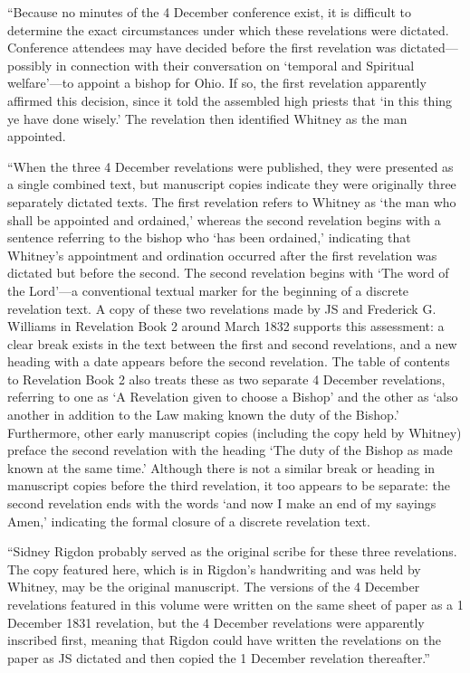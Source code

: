 				``Because no minutes of the 4 December conference exist, it is difficult to determine the exact circumstances under which these revelations were dictated. Conference attendees may have decided before the first revelation was dictated---possibly in connection with their conversation on `temporal and Spiritual welfare'---to appoint a bishop for Ohio. If so, the first revelation apparently affirmed this decision, since it told the assembled high priests that `in this thing ye have done wisely.' The revelation then identified Whitney as the man appointed.

				``When the three 4 December revelations were published, they were presented as a single combined text, but manuscript copies indicate they were originally three separately dictated texts. The first revelation refers to Whitney as `the man who shall be appointed and ordained,' whereas the second revelation begins with a sentence referring to the bishop who `has been ordained,' indicating that Whitney's appointment and ordination occurred after the first revelation was dictated but before the second. The second revelation begins with `The word of the Lord'---a conventional textual marker for the beginning of a discrete revelation text. A copy of these two revelations made by JS and Frederick G. Williams in Revelation Book 2 around March 1832 supports this assessment: a clear break exists in the text between the first and second revelations, and a new heading with a date appears before the second revelation. The table of contents to Revelation Book 2 also treats these as two separate 4 December revelations, referring to one as `A Revelation given to choose a Bishop' and the other as `also another in addition to the Law making known the duty of the Bishop.' Furthermore, other early manuscript copies (including the copy held by Whitney) preface the second revelation with the heading `The duty of the Bishop as made known at the same time.' Although there is not a similar break or heading in manuscript copies before the third revelation, it too appears to be separate: the second revelation ends with the words `and now I make an end of my sayings Amen,' indicating the formal closure of a discrete revelation text.

				``Sidney Rigdon probably served as the original scribe for these three revelations. The copy featured here, which is in Rigdon's handwriting and was held by Whitney, may be the original manuscript. The versions of the 4 December revelations featured in this volume were written on the same sheet of paper as a 1 December 1831 revelation, but the 4 December revelations were apparently inscribed first, meaning that Rigdon could have written the revelations on the paper as JS dictated and then copied the 1 December revelation thereafter.''
			

